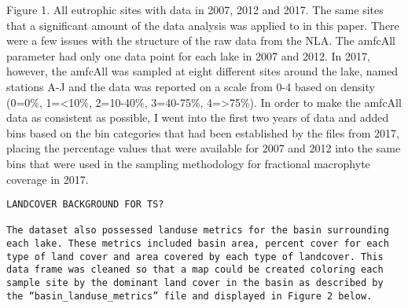 \documentclass[
]{book}
\begin{document}
Figure 1. All eutrophic sites with data in 2007, 2012 and 2017. The same sites that a significant amount of the data analysis was applied to in this paper.
There were a few issues with the structure of the raw data from the NLA. The amfcAll parameter had only one data point for each lake in 2007 and 2012. In 2017, however, the amfcAll was sampled at eight different sites around the lake, named stations A-J and the data was reported on a scale from 0-4 based on density (0=0\%, 1=\textless10\%, 2=10-40\%, 3=40-75\%, 4=\textgreater75\%). In order to make the amfcAll data as consistent as possible, I went into the first two years of data and added bins based on the bin categories that had been established by the files from 2017, placing the percentage values that were available for 2007 and 2012 into the same bins that were used in the sampling methodology for fractional macrophyte coverage in 2017.

\begin{verbatim}
LANDCOVER BACKGROUND FOR TS? 

The dataset also possessed landuse metrics for the basin surrounding each lake. These metrics included basin area, percent cover for each type of land cover and area covered by each type of landcover. This data frame was cleaned so that a map could be created coloring each sample site by the dominant land cover in the basin as described by the “basin_landuse_metrics” file and displayed in Figure 2 below. 
\end{verbatim}
\end{document}
